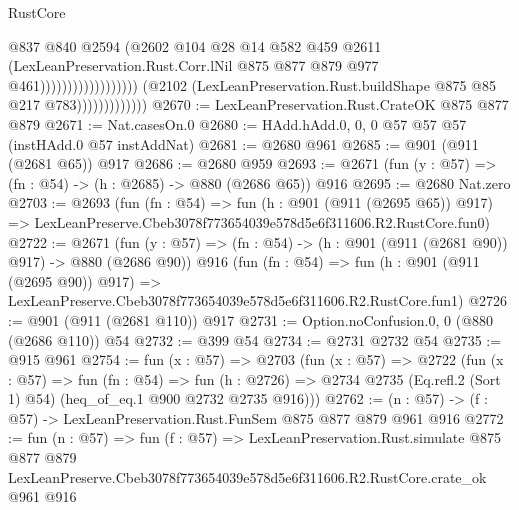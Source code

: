 \begin{lexlean}{RustCore}
\begin{coremodule}
                                                          @837
                                                          @840
                                                          @2594
                                                          (@2602
                                                            @104
                                                            @28
                                                            @14
                                                            @582
                                                            @459
                                                            @2611
                                                            (LexLeanPreservation.Rust.Corr.lNil
                                                              @875
                                                              @877
                                                              @879
                                                              @977
                                                              @461))))))))))))))))))
                          (@2102
                            (LexLeanPreservation.Rust.buildShape @875 @85 @217 @783)))))))))))))
@2670 := LexLeanPreservation.Rust.CrateOK @875 @877 @879
@2671 := Nat.casesOn.{0}
@2680 := HAdd.hAdd.{0, 0, 0} @57 @57 @57 (instHAdd.{0} @57 instAddNat)
@2681 := @2680 @961
@2685 := @901 (@911 (@2681 @65)) @917
@2686 := @2680 @959
@2693 := @2671 (fun (y : @57) => (fn : @54) -> (h : @2685) -> @880 (@2686 @65)) @916
@2695 := @2680 Nat.zero
@2703 := @2693
    (fun (fn : @54) =>
    fun (h : @901 (@911 (@2695 @65)) @917) =>
    LexLeanPreserve.Cbeb3078f773654039e578d5e6f311606.R2.RustCore.fun0)
@2722 := @2671
    (fun (y : @57) => (fn : @54) -> (h : @901 (@911 (@2681 @90)) @917) -> @880 (@2686 @90))
    @916
    (fun (fn : @54) =>
    fun (h : @901 (@911 (@2695 @90)) @917) =>
    LexLeanPreserve.Cbeb3078f773654039e578d5e6f311606.R2.RustCore.fun1)
@2726 := @901 (@911 (@2681 @110)) @917
@2731 := Option.noConfusion.{0, 0} (@880 (@2686 @110)) @54
@2732 := @399 @54
@2734 := @2731 @2732 @54
@2735 := @915 @961
@2754 := fun (x : @57) =>
  @2703
    (fun (x : @57) =>
    @2722
      (fun (x : @57) =>
      fun (fn : @54) =>
      fun (h : @2726) =>
      @2734 @2735 (Eq.refl.{2} (Sort 1) @54) (heq_of_eq.{1} @900 @2732 @2735 @916)))
@2762 := (n : @57) -> (f : @57) -> LexLeanPreservation.Rust.FunSem @875 @877 @879 @961 @916
@2772 := fun (n : @57) =>
  fun (f : @57) =>
  LexLeanPreservation.Rust.simulate
    @875
    @877
    @879
    LexLeanPreserve.Cbeb3078f773654039e578d5e6f311606.R2.RustCore.crate_ok
    @961
    @916
\end{coremodule}
\end{lexlean}
